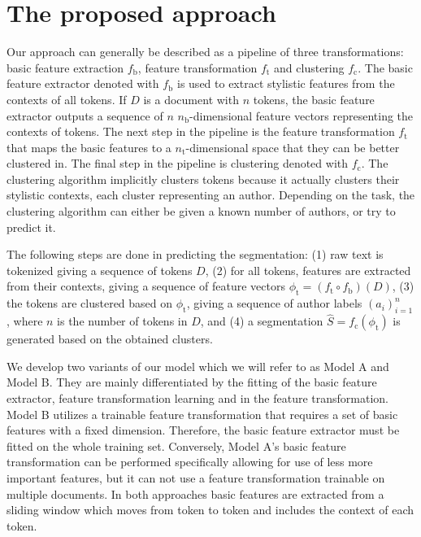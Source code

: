 \documentclass[10pt, a4paper]{article}
\begin{document}
\section{The proposed approach} \label{sec:the-proposed-approach}

Our approach can generally be described as a pipeline of three transformations: basic feature extraction $f_\mathrm{b}$, feature transformation $f_\mathrm{t}$ and clustering $f_\mathrm{c}$. The basic feature extractor denoted with $f_\mathrm{b}$ is used to extract stylistic features from the contexts of all tokens. If $D$ is a document with $n$ tokens, the basic feature extractor outputs a sequence of $n$ $n_\mathrm{b}$-dimensional feature vectors representing the contexts of tokens. The next step in the pipeline is the feature transformation $f_\mathrm{t}$ that maps the basic features to a $n_\mathrm{t}$-dimensional space that they can be better clustered in. The final step in the pipeline is clustering denoted with $f_\mathrm{c}$. The clustering algorithm implicitly clusters tokens because it actually clusters their stylistic contexts, each cluster representing an author. Depending on the task, the clustering algorithm can either be given a known number of authors, or try to predict it.

The following steps are done in predicting the segmentation: (1) raw text is tokenized giving a sequence of tokens $D$, (2) for all tokens, features are extracted from their contexts, giving a sequence of feature vectors $\phi_\mathrm{t} = (f_\mathrm{t}\circ f_\mathrm{b})(D)$, (3) the tokens are clustered based on $\phi_\mathrm{t}$, giving a sequence of author labels $(a_i)_{i=1}^{n}$, where $n$ is the number of tokens in $D$, and (4) a segmentation $\hat{S}=f_\mathrm{c}(\phi_\mathrm{t})$ is generated based on the obtained clusters.

We develop two variants of our model which we will refer to as Model A and Model B. They are mainly differentiated by the fitting of the basic feature extractor, feature transformation learning and in the feature transformation. Model B utilizes a trainable feature transformation that requires a set of basic features with a fixed dimension. Therefore, the basic feature extractor must be fitted on the whole training set. Conversely, Model A's basic feature transformation can be performed specifically allowing for use of less more important features, but it can not use a feature transformation trainable on multiple documents. In both approaches basic features are extracted from a sliding window which moves from token to token and includes the context of each token.
\end{document}
